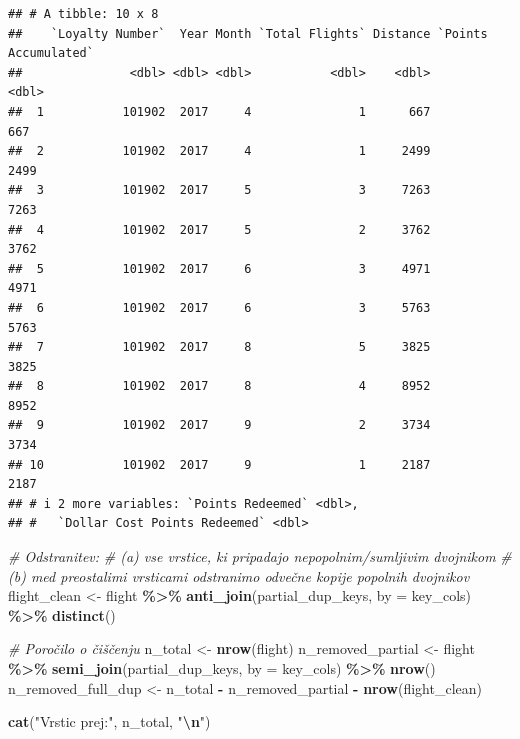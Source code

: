 \documentclass[
]{article}
\newenvironment{Shaded}{\begin{snugshade}}{\end{snugshade}}
\newcommand{\AttributeTok}[1]{\textcolor[rgb]{0.13,0.29,0.53}{#1}}
\newcommand{\CommentTok}[1]{\textcolor[rgb]{0.56,0.35,0.01}{\textit{#1}}}
\newcommand{\FunctionTok}[1]{\textcolor[rgb]{0.13,0.29,0.53}{\textbf{#1}}}
\newcommand{\NormalTok}[1]{#1}
\newcommand{\OtherTok}[1]{\textcolor[rgb]{0.56,0.35,0.01}{#1}}
\newcommand{\SpecialCharTok}[1]{\textcolor[rgb]{0.81,0.36,0.00}{\textbf{#1}}}
\newcommand{\StringTok}[1]{\textcolor[rgb]{0.31,0.60,0.02}{#1}}
\begin{document}
\begin{verbatim}
## # A tibble: 10 x 8
##    `Loyalty Number`  Year Month `Total Flights` Distance `Points Accumulated`
##               <dbl> <dbl> <dbl>           <dbl>    <dbl>                <dbl>
##  1           101902  2017     4               1      667                  667
##  2           101902  2017     4               1     2499                 2499
##  3           101902  2017     5               3     7263                 7263
##  4           101902  2017     5               2     3762                 3762
##  5           101902  2017     6               3     4971                 4971
##  6           101902  2017     6               3     5763                 5763
##  7           101902  2017     8               5     3825                 3825
##  8           101902  2017     8               4     8952                 8952
##  9           101902  2017     9               2     3734                 3734
## 10           101902  2017     9               1     2187                 2187
## # i 2 more variables: `Points Redeemed` <dbl>,
## #   `Dollar Cost Points Redeemed` <dbl>
\end{verbatim}

\begin{Shaded}
\begin{Highlighting}[]
\CommentTok{\# Odstranitev:}
\CommentTok{\#   (a) vse vrstice, ki pripadajo nepopolnim/sumljivim dvojnikom}
\CommentTok{\#   (b) med preostalimi vrsticami odstranimo odvečne kopije popolnih dvojnikov}
\NormalTok{flight\_clean }\OtherTok{\textless{}{-}}\NormalTok{ flight }\SpecialCharTok{\%\textgreater{}\%}
  \FunctionTok{anti\_join}\NormalTok{(partial\_dup\_keys, }\AttributeTok{by =}\NormalTok{ key\_cols) }\SpecialCharTok{\%\textgreater{}\%}
  \FunctionTok{distinct}\NormalTok{()}

\CommentTok{\# Poročilo o čiščenju}
\NormalTok{n\_total            }\OtherTok{\textless{}{-}} \FunctionTok{nrow}\NormalTok{(flight)}
\NormalTok{n\_removed\_partial  }\OtherTok{\textless{}{-}}\NormalTok{ flight }\SpecialCharTok{\%\textgreater{}\%} \FunctionTok{semi\_join}\NormalTok{(partial\_dup\_keys, }\AttributeTok{by =}\NormalTok{ key\_cols) }\SpecialCharTok{\%\textgreater{}\%} \FunctionTok{nrow}\NormalTok{()}
\NormalTok{n\_removed\_full\_dup }\OtherTok{\textless{}{-}}\NormalTok{ n\_total }\SpecialCharTok{{-}}\NormalTok{ n\_removed\_partial }\SpecialCharTok{{-}} \FunctionTok{nrow}\NormalTok{(flight\_clean)}

\FunctionTok{cat}\NormalTok{(}\StringTok{"Vrstic prej:"}\NormalTok{, n\_total, }\StringTok{"}\SpecialCharTok{\textbackslash{}n}\StringTok{"}\NormalTok{)}
\end{Highlighting}
\end{Shaded}
\end{document}
